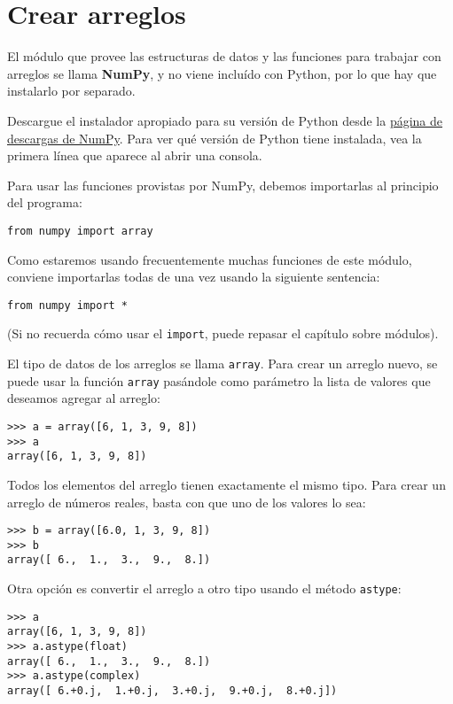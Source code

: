 \section{Crear arreglos}

El módulo que provee las estructuras de datos y las funciones para
trabajar con arreglos se llama \textbf{NumPy}, y no viene incluído con
Python, por lo que hay que instalarlo por separado.

Descargue el instalador apropiado para su versión de Python desde la
\href{http://tinyurl.com/bajar-numpy}{página de descargas de NumPy}.
Para ver qué versión de Python tiene instalada, vea la primera línea que
aparece al abrir una consola.

Para usar las funciones provistas por NumPy, debemos importarlas al
principio del programa:

\begin{lstlisting}
from numpy import array
\end{lstlisting}

Como estaremos usando frecuentemente muchas funciones de este módulo,
conviene importarlas todas de una vez usando la siguiente sentencia:

\begin{lstlisting}
from numpy import *
\end{lstlisting}

(Si no recuerda cómo usar el \lstinline!import!, puede repasar el
capítulo sobre módulos).

El tipo de datos de los arreglos se llama \lstinline!array!. Para crear
un arreglo nuevo, se puede usar la función \lstinline!array! pasándole
como parámetro la lista de valores que deseamos agregar al arreglo:

\begin{lstlisting}
>>> a = array([6, 1, 3, 9, 8])
>>> a
array([6, 1, 3, 9, 8])
\end{lstlisting}

Todos los elementos del arreglo tienen exactamente el mismo tipo. Para
crear un arreglo de números reales, basta con que uno de los valores lo
sea:

\begin{lstlisting}
>>> b = array([6.0, 1, 3, 9, 8])
>>> b
array([ 6.,  1.,  3.,  9.,  8.])
\end{lstlisting}

Otra opción es convertir el arreglo a otro tipo usando el método
\lstinline!astype!:

\begin{lstlisting}
>>> a
array([6, 1, 3, 9, 8])
>>> a.astype(float)
array([ 6.,  1.,  3.,  9.,  8.])
>>> a.astype(complex)
array([ 6.+0.j,  1.+0.j,  3.+0.j,  9.+0.j,  8.+0.j])
\end{lstlisting}

